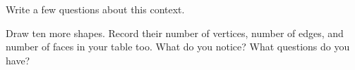 \documentclass[nooutcomes,noauthor]{ximera}
\begin{document}
\begin{problem}
Write a few questions about this context.  
\begin{freeResponse}
\end{freeResponse}
\vfill
\end{problem}



\newpage

\begin{question}
Draw ten more shapes. Record their number of vertices, number of edges, and number of faces in your table too.  What do you notice?  What questions do you have?  
\vfill
\end{question}

%
%
%
\end{document}

